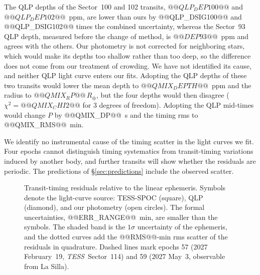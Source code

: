 \documentclass[twocolumn,linenumbers]{aastex701}
\newcommand{\tess}{\textit{TESS}}
\newcommand{\rearth}{R_\oplus}
\begin{document}
The QLP depths of the Sector~100 and 102 transits, $@@QLP_DEP100@@$ and $@@QLP_DEP102@@$~ppm, are lower than ours by @@QLP_DSIG100@@ and @@QLP_DSIG102@@ times the combined uncertainty, whereas the Sector~93 QLP depth, measured before the change of method, is $@@DEP93@@$~ppm and agrees with the others. Our photometry is not corrected for neighboring stars, which would make its depths too shallow rather than too deep, so the difference does not come from our treatment of crowding. We have not identified its cause, and neither QLP light curve enters our fits. Adopting the QLP depths of these two transits would lower the mean depth to $@@QMIX_DEPTH@@$~ppm and the radius to $@@QMIX_RP@@\,\rearth$, but the four depths would then disagree ($\chi^2 = @@QMIX_CHI2@@$ for 3 degrees of freedom). Adopting the QLP mid-times would change $P$ by @@QMIX_DP@@~s and the timing rms to @@QMIX_RMS@@~min.

We identify no instrumental cause of the timing scatter in the light curves we fit. Four epochs cannot distinguish timing systematics from transit-timing variations induced by another body, and further transits will show whether the residuals are periodic. The predictions of \S\ref{sec:predictions} include the observed scatter.

\begin{figure}
\caption{Transit-timing residuals relative to the linear ephemeris. Symbols denote the light-curve source: TESS-SPOC (square), QLP (diamond), and our photometry (open circles). The formal uncertainties, @@ERR_RANGE@@~min, are smaller than the symbols. The shaded band is the $1\sigma$ uncertainty of the ephemeris, and the dotted curves add the @@RMS@@-min rms scatter of the residuals in quadrature. Dashed lines mark epochs 57 (2027 February~19, \tess\ Sector~114) and 59 (2027 May~3, observable from La Silla).\label{fig:oc}}
\end{figure}
\end{document}
